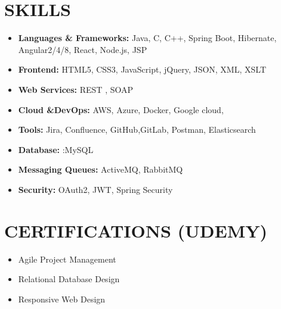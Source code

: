 \documentclass[letterpaper,11pt]{article}
\newcommand{\resumeItem}[1]{\item\small{{#1 \vspace{-3pt}}}}
\newcommand{\resumeSubHeadingListStart}{\begin{itemize}[leftmargin=0.15in, label={}]}
\newcommand{\resumeSubHeadingListEnd}{\end{itemize}}
\newcommand{\resumeItemListStart}{\begin{itemize}}
\newcommand{\resumeItemListEnd}{\end{itemize}\vspace{-5pt}}
\begin{document}
\section{{\fontsize{9pt}{20pt}\selectfont \textbf{SKILLS}}}\resumeSubHeadingListStart
\resumeItem{\textbf{Languages \& Frameworks:} Java, C, C++, Spring Boot, Hibernate, Angular2/4/8, React, Node.js, JSP}\vspace{-7pt}
\resumeItem{\textbf{Frontend:} HTML5, CSS3, JavaScript, jQuery, JSON, XML, XSLT}\vspace{-7pt}
\resumeItem{\textbf{Web Services:} REST , SOAP}\vspace{-7pt}
\resumeItem{\textbf{Cloud \&DevOps:} AWS, Azure, Docker, Google cloud,}\vspace{-7pt}
\resumeItem{\textbf{Tools:} Jira, Confluence, GitHub,GitLab, Postman, Elasticsearch}\vspace{-7pt}
\resumeItem{\textbf{Database:} :MySQL}\vspace{-7pt}
\resumeItem{\textbf{Messaging Queues:} ActiveMQ, RabbitMQ}\vspace{-7pt}
\resumeItem{\textbf{Security:} OAuth2, JWT, Spring Security}
\resumeSubHeadingListEnd\vspace{-10pt}
\section{{\fontsize{9pt}{20pt}\selectfont \textbf{CERTIFICATIONS (UDEMY)}}}
\resumeItemListStart
\resumeItem{Agile Project Management}
\vspace{-8pt}
\resumeItem{Relational Database Design}
\vspace{-8pt}
\resumeItem{Responsive Web Design}
\vspace{-8pt}
\resumeItemListEnd
\vspace{-8pt}
\end{document}
